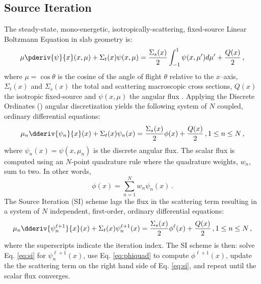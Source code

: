 
\subsection{Source Iteration}
The steady-state, mono-energetic, isotropically-scattering, fixed-source Linear Boltzmann Equation in slab geometry is: 
	\begin{equation} \label{eq:bte}
		\mu \pderiv{\psi}{x}(x, \mu) + \Sigma_t(x) \psi(x,\mu) = 
		\frac{\Sigma_s(x)}{2} \int_{-1}^{1} \psi(x, \mu') d\mu' + \frac{Q(x)}{2} \,,
	\end{equation}
where $\mu = \cos\theta$ is the cosine of the angle of flight $\theta$ relative to the $x$--axis, $\Sigma_t(x)$ and $\Sigma_s(x)$ the total and scattering macroscopic cross sections, $Q(x)$ the isotropic fixed-source and $\psi(x, \mu)$ the angular flux \cite{adams}. Applying the Discrete Ordinates (\SN) angular discretization yields the following system of $N$ coupled, ordinary differential equations: 
	\begin{equation} \label{eq:sn}
		\mu_n \dderiv{\psi_n}{x}(x) + \Sigma_t(x) \psi_n(x) = 
		\frac{\Sigma_s(x)}{2} \phi(x) + \frac{Q(x)}{2} \,, 1 \leq n \leq N \,,
	\end{equation}
where $\psi_n(x) = \psi(x, \mu_n)$ is the discrete angular flux. The scalar flux is computed using an $N$-point quadrature rule where the quadrature weights, $w_n$, sum to two. In other words, 
	\begin{equation} \label{eq:phiquad}
		\phi(x) = \sum_{n=1}^N w_n \psi_n(x) \,.
	\end{equation}
The Source Iteration (SI) scheme lags the flux in the scattering term resulting in a system of $N$ independent, first-order, ordinary differential equations: 
	\begin{equation} \label{eq:si}
			\mu_n \dderiv{\psi_n^{\ell+1}}{x}(x) + \Sigma_t(x) \psi_n^{\ell+1}(x) = 
			\frac{\Sigma_s(x)}{2} \phi^{\ell}(x) + \frac{Q(x)}{2} \,, 1 \leq n \leq N \,,
		\end{equation}
where the superscripts indicate the iteration index. The SI scheme is then: solve Eq. \ref{eq:si} for $\psi_n^{\ell+1}(x)$, use Eq. \ref{eq:phiquad} to compute $\phi^{\ell+1}(x)$, update the the scattering term on the right hand side of Eq. \ref{eq:si}, and repeat until the scalar flux converges. 

